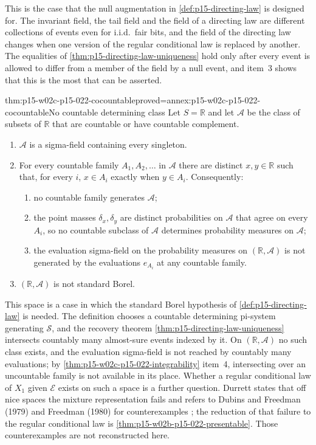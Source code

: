 This is the case that the null augmentation in
\cref{def:p15-directing-law} is designed for. The invariant field, the
tail field and the field of a directing law are different collections of
events even for i.i.d.\ fair bits, and the field of the directing law
changes when one version of the regular conditional law is replaced by
another. The equalities of \cref{thm:p15-directing-law-uniqueness} hold
only after every event is allowed to differ from a member of the field by
a null event, and item~3 shows that this is the most that can be asserted.

\begin{hbtheorem}{thm:p15-w02c-p15-022-cocountable}{proved=annex:p15-w02c-p15-022-cocountable}{No countable determining class}
Let \(S=\mathbb R\) and let \(\mathcal A\) be the class of subsets
of \(\mathbb R\) that are countable or have countable complement.
\begin{enumerate}
\item \(\mathcal A\) is a sigma-field containing every singleton.
\item For every countable family \(A_1,A_2,\ldots\) in \(\mathcal A\)
      there are distinct \(x,y\in\mathbb R\) such that, for every \(i\),
      \(x\in A_i\) exactly when \(y\in A_i\). Consequently:
      \begin{enumerate}
      \item no countable family generates \(\mathcal A\);
      \item the point masses \(\delta_x,\delta_y\) are distinct
            probabilities on \(\mathcal A\) that agree on every \(A_i\),
            so no countable subclass of \(\mathcal A\) determines
            probability measures on \(\mathcal A\);
      \item the evaluation sigma-field on the probability measures on
            \((\mathbb R,\mathcal A)\) is not generated by the
            evaluations \(e_{A_i}\) at any countable family.
      \end{enumerate}
\item \((\mathbb R,\mathcal A)\) is not standard Borel.
\end{enumerate}
\end{hbtheorem}

This space is a case in which the standard Borel hypothesis of
\cref{def:p15-directing-law} is needed. The definition chooses a
countable determining pi-system generating \(\mathcal S\), and the
recovery theorem \cref{thm:p15-directing-law-uniqueness} intersects
countably many almost-sure events indexed by it. On
\((\mathbb R,\mathcal A)\) no such class exists, and the evaluation
sigma-field is not reached by countably many evaluations; by
\cref{thm:p15-w02c-p15-022-integrability} item~4, intersecting over an
uncountable family is not available in its place. Whether a regular
conditional law of \(X_1\) given \(\mathcal E\) exists on such a space is
a further question. Durrett states that off nice spaces the
mixture representation fails and refers to Dubins and Freedman (1979) and
Freedman (1980) for counterexamples \cite[p.~254]{DurrettPTEAuthor2019};
the reduction of that failure to the regular conditional law is
\cref{thm:p15-w02b-p15-022-presentable}. Those counterexamples are not
reconstructed here.

